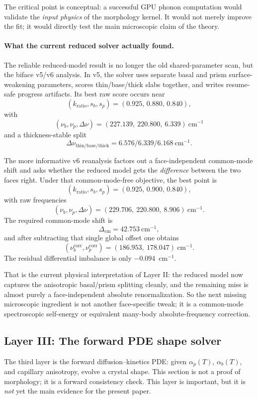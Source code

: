 \documentclass[12pt,letterpaper]{article}
\begin{document}
The critical point is conceptual: a successful GPU phonon computation
would validate the \emph{input physics} of the morphology kernel.
It would not merely improve the fit; it would directly test the main
microscopic claim of the theory.

\paragraph{What the current reduced solver actually found.}
The reliable reduced-model result is no longer the old shared-parameter
scan, but the biface v5/v6 analysis.
In v5, the solver uses separate basal and prism surface-weakening
parameters, scores thin/base/thick slabs together, and writes
resume-safe progress artifacts.
Its best raw score occurs near
\[
(k_{\mathrm{ratio}}, s_b, s_p) = (0.925,\,0.880,\,0.840),
\]
with
\[
(\nu_b,\nu_p,\Delta\nu) = (227.139,\ 220.800,\ 6.339)\ \mathrm{cm}^{-1}
\]
and a thickness-stable split
\[
\Delta\nu_{\mathrm{thin/base/thick}} = 6.576/6.339/6.168\ \mathrm{cm}^{-1}.
\]

The more informative v6 reanalysis factors out a face-independent
common-mode shift and asks whether the reduced model gets the
\emph{difference} between the two faces right.
Under that common-mode-free objective, the best point is
\[
(k_{\mathrm{ratio}}, s_b, s_p) = (0.925,\,0.900,\,0.840),
\]
with raw frequencies
\[
(\nu_b,\nu_p,\Delta\nu) = (229.706,\ 220.800,\ 8.906)\ \mathrm{cm}^{-1}.
\]
The required common-mode shift is
\[
\Delta_{\mathrm{cm}} = 42.753\ \mathrm{cm}^{-1},
\]
and after subtracting that single global offset one obtains
\[
(\nu_b^{\mathrm{corr}},\nu_p^{\mathrm{corr}}) = (186.953,\ 178.047)\ \mathrm{cm}^{-1}.
\]
The residual differential imbalance is only $-0.094$~cm$^{-1}$.

That is the current physical interpretation of Layer II:
the reduced model now captures the anisotropic basal/prism splitting
cleanly, and the remaining miss is almost purely a face-independent
absolute renormalization.
So the next missing microscopic ingredient is not another
face-specific tweak; it is a common-mode spectroscopic self-energy or
equivalent many-body absolute-frequency correction.

\subsection{Layer III: The forward PDE shape solver}

The third layer is the forward diffusion--kinetics PDE: given
$\alpha_p(T)$, $\alpha_b(T)$, and capillary anisotropy, evolve a crystal
shape.  This section is not a proof of morphology; it is a forward consistency
check.
This layer is important, but it is \emph{not} yet the main evidence for
the present paper.
\end{document}
